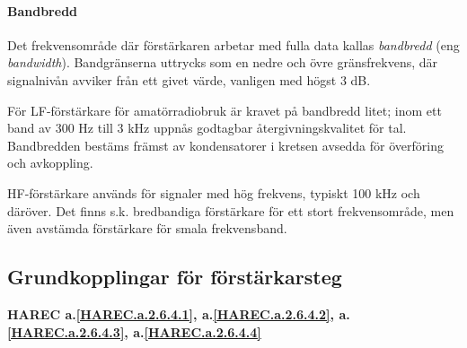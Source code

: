 \paragraph{Bandbredd}
Det frekvensområde där förstärkaren arbetar med fulla data kallas
\emph{bandbredd} (eng \emph{bandwidth}). Bandgränserna uttrycks som en nedre
och övre gränsfrekvens, där signalnivån avviker från ett givet värde, vanligen
med högst 3 dB.

För LF-förstärkare för amatörradiobruk är kravet på bandbredd litet;
inom ett band av 300 Hz till 3 kHz uppnås godtagbar
återgivningskvalitet för tal. Bandbredden bestäms främst av
kondensatorer i kretsen avsedda för överföring och avkoppling.

HF-förstärkare används för signaler med hög frekvens, typiskt 100 kHz
och däröver.  Det finns s.k. bredbandiga förstärkare för ett stort
frekvensområde, men även avstämda förstärkare för smala frekvensband.

\subsection{Grundkopplingar för förstärkarsteg}
\textbf{HAREC a.\ref{HAREC.a.2.6.4.1}, a.\ref{HAREC.a.2.6.4.2}, a.\ref{HAREC.a.2.6.4.3}, a.\ref{HAREC.a.2.6.4.4}\label{myHAREC.a.2.6.4.1}\label{myHAREC.a.2.6.4.2}\label{myHAREC.a.2.6.4.3}\label{myHAREC.a.2.6.4.4}}

